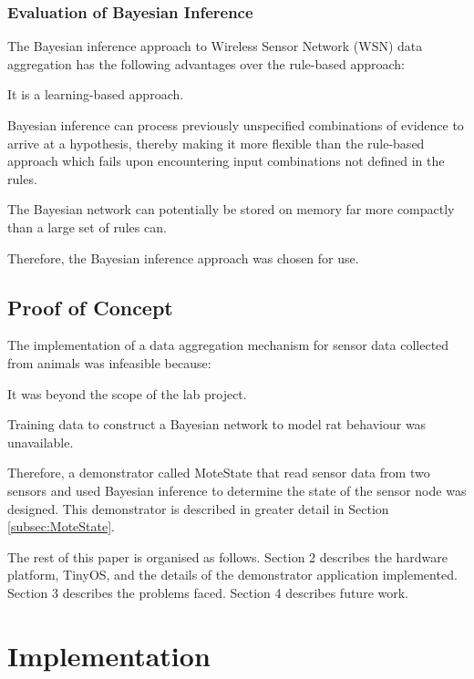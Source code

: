 \documentclass{sig-alternate-10pt}
\begin{document}
\subsubsection{Evaluation of Bayesian Inference}

The Bayesian inference approach to Wireless Sensor Network (WSN) data aggregation has
the following advantages over the rule-based approach:

\begin{compactitem}
  \item It is a learning-based approach.
  \item Bayesian inference can
  process previously unspecified combinations of evidence to arrive at a
  hypothesis, thereby making it more flexible than the rule-based approach which
  fails upon encountering input combinations not defined in the rules.
  \item The Bayesian network can potentially be stored on memory far more
  compactly than a large set of rules can.
\end{compactitem} 

Therefore, the Bayesian inference approach was chosen for use.

\subsection{Proof of Concept}\label{subsec:ProofOfConcept}

The implementation of a data aggregation mechanism for sensor data
collected from animals was infeasible because: 
\begin{compactitem}
\item It was beyond the scope of
the lab project.
\item Training data to construct a Bayesian network to model
rat behaviour was unavailable. 
\end{compactitem}

Therefore, a demonstrator called MoteState that read
sensor data
from two sensors and used Bayesian inference to determine the state of the
sensor node was designed. This demonstrator is described in greater detail in
Section \ref{subsec:MoteState}.

The rest of this paper is organised as follows. Section 2 describes the hardware
platform, TinyOS, and the details of the demonstrator application implemented.
Section 3 describes the problems faced. Section 4 describes future work.

\section{Implementation} 
\end{document}
